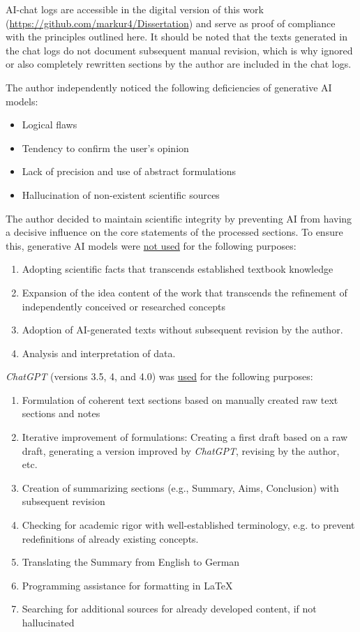 AI-chat logs are accessible in the digital version of this work
(\url{https://github.com/markur4/Dissertation}) and serve as proof of compliance
with the principles outlined here. It should be noted that the texts generated
in the chat logs do not document subsequent manual revision, which is why
ignored or also completely rewritten sections by the author are included in the
chat logs.

\noindent The author independently noticed the following deficiencies of generative AI models:
\begin{itemize}
    \item Logical flaws
    \item Tendency to confirm the user’s opinion
    \item Lack of precision and use of abstract formulations
    \item Hallucination of non-existent scientific sources
\end{itemize}

\noindent The author decided to maintain scientific integrity by preventing AI
from having a decisive influence on the core statements of the processed
sections. To ensure this, generative AI models were \underline{not used} for
the following purposes:
\begin{enumerate}
    \item Adopting scientific facts that transcends established textbook knowledge
    \item Expansion of the idea content of the work that transcends the
          refinement of independently conceived or researched concepts
    \item Adoption of AI-generated texts without subsequent revision by the author.
    \item Analysis and interpretation of data.
\end{enumerate}

\noindent \textit{ChatGPT} (versions 3.5, 4, and 4.0) was \underline{used} for the following purposes:
\begin{enumerate}
    \item Formulation of coherent text sections based on manually created raw text sections and notes
    \item Iterative improvement of formulations: Creating a first draft based on
          a raw draft, generating a version improved by \textit{ChatGPT}, revising by the
          author, etc.
    \item Creation of summarizing sections (e.g., Summary, Aims, Conclusion) with subsequent revision
    \item Checking for academic rigor with well-established terminology, e.g. to
          prevent redefinitions of already existing concepts.
    \item Translating the Summary from English to German
    \item Programming assistance for formatting in LaTeX
    \item Searching for additional sources for already developed content, if not hallucinated
\end{enumerate}

